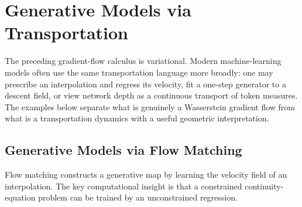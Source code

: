 
\chapter{Generative Models via Transportation}
\label{sec-generative-models-transportation}

The preceding gradient-flow calculus is variational. Modern machine-learning models often use the same transportation language more broadly: one may prescribe an interpolation and regress its velocity, fit a one-step generator to a descent field, or view network depth as a continuous transport of token measures. The examples below separate what is genuinely a Wasserstein gradient flow from what is a transportation dynamics with a useful geometric interpretation.

\section{Generative Models via Flow Matching}
\label{sec-generative-flow-matching}

Flow matching constructs a generative map by learning the velocity field of an interpolation. The key computational insight is that a constrained continuity-equation problem can be trained by an unconstrained regression.

